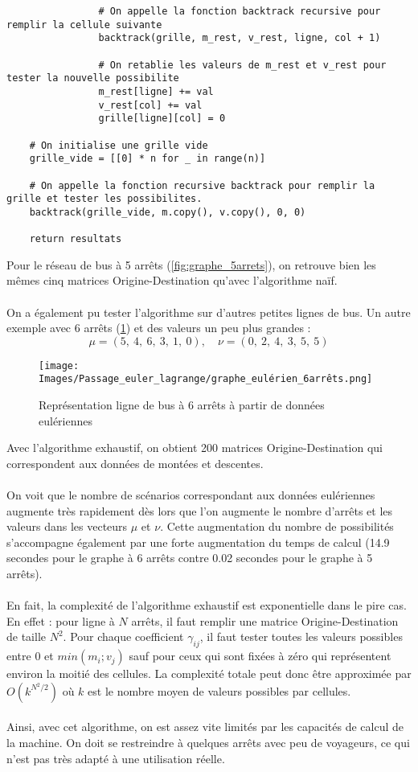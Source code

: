 \documentclass[12pt]{article}
\begin{document}
\begin{lstlisting}
                # On appelle la fonction backtrack recursive pour remplir la cellule suivante
                backtrack(grille, m_rest, v_rest, ligne, col + 1)

                # On retablie les valeurs de m_rest et v_rest pour tester la nouvelle possibilite
                m_rest[ligne] += val
                v_rest[col] += val
                grille[ligne][col] = 0

    # On initialise une grille vide
    grille_vide = [[0] * n for _ in range(n)]

    # On appelle la fonction recursive backtrack pour remplir la grille et tester les possibilites.
    backtrack(grille_vide, m.copy(), v.copy(), 0, 0)

    return resultats
\end{lstlisting}
Pour le réseau de bus à 5 arrêts (\ref{fig:graphe_5arrets}), on retrouve bien les mêmes cinq matrices Origine-Destination qu'avec l'algorithme naïf.\\
\\
On a également pu tester l'algorithme sur d'autres petites lignes de bus. Un autre exemple avec 6 arrêts (\ref{graphe_euler_6arrêts}) et des valeurs un peu plus grandes :\\
\[ 
\mu = (5,\:4,\:6,\:3,\:1,\:0), \quad \nu = (0,\: 2,\: 4, \:3,\: 5,\: 5)
\]
\begin{figure}[H]
    \centering
    \texttt{[image: Images/Passage\_euler\_lagrange/graphe\_eulérien\_6arrêts.png]}
    \caption{Représentation ligne de bus à 6 arrêts à partir de données eulériennes}
    \label{graphe_euler_6arrêts}
\end{figure}
Avec l'algorithme exhaustif, on obtient 200 matrices Origine-Destination qui correspondent aux données de montées et descentes.\\
\\
On voit que le nombre de scénarios correspondant aux données eulériennes augmente très rapidement dès lors que l'on augmente le nombre d'arrêts et les valeurs dans les vecteurs $\mu$ et $\nu$. Cette augmentation du nombre de possibilités s'accompagne également par une forte augmentation du temps de calcul (14.9 secondes pour le graphe à 6 arrêts contre 0.02 secondes pour le graphe à 5 arrêts).\\
\\
En fait, la complexité de l'algorithme exhaustif est exponentielle dans le pire cas. En effet : pour ligne à $N$ arrêts, il faut remplir une matrice Origine-Destination de taille $N^2$. Pour chaque coefficient $\gamma_{ij}$, il faut tester toutes les valeurs possibles entre 0 et $min(m_i;v_j)$ sauf pour ceux qui sont fixées à zéro qui représentent environ la moitié des cellules. La complexité totale peut donc être approximée par $O(k^{N^2/2})$ où $k$ est le nombre moyen de valeurs possibles par cellules.\\
\\
Ainsi, avec cet algorithme, on est assez vite limités par les capacités de calcul de la machine. On doit se restreindre à quelques arrêts avec peu de voyageurs, ce qui n'est pas très adapté à une utilisation réelle.
\end{document}
